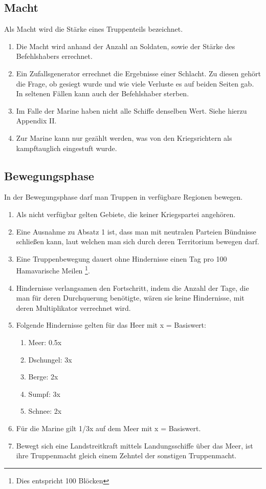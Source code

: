 \documentclass{article}
\begin{document}
\subsection{Macht}\label{macht}
Als Macht wird die Stärke eines Truppenteils bezeichnet.
\begin{enumerate}[(1)]
	\item Die Macht wird anhand der Anzahl an Soldaten, sowie der Stärke des Befehlshabers errechnet.
	\item Ein Zufallsgenerator errechnet die Ergebnisse einer Schlacht. Zu diesen gehört die Frage, ob gesiegt wurde und wie viele Verluste es auf beiden Seiten gab. In seltenen Fällen kann auch der Befehlshaber sterben.
	\item Im Falle der Marine haben nicht alle Schiffe denselben Wert. Siehe hierzu Appendix II.
	\item Zur Marine kann nur gezählt werden, was von den Kriegsrichtern als kampftauglich eingestuft wurde.
\end{enumerate}

\subsection{Bewegungsphase}
In der Bewegungsphase darf man Truppen in verfügbare Regionen bewegen.
\begin{enumerate}[(1)]
	\item Als nicht verfügbar gelten Gebiete, die keiner Kriegspartei angehören.
	\item Eine Ausnahme zu Absatz 1 ist, dass man mit neutralen Parteien Bündnisse schließen kann, laut welchen man sich durch deren Territorium bewegen darf.
	\item Eine Truppenbewegung dauert ohne Hindernisse einen Tag pro 100 Hamavarische Meilen \footnote{Dies entspricht 100 Blöcken}.
	\item Hindernisse verlangsamen den Fortschritt, indem die Anzahl der Tage, die man für deren Durchquerung benötigte, wären sie keine Hindernisse, mit deren Multiplikator verrechnet wird.
	\item Folgende Hindernisse gelten für das Heer mit x = Basiswert:
	\begin{enumerate}[1.]
		\item Meer: 0.5x
		\item Dschungel: 3x
		\item Berge: 2x
		\item Sumpf: 3x
		\item Schnee: 2x
	\end{enumerate}
	\item Für die Marine gilt 1/3x auf dem Meer mit x = Basiswert.
	\item Bewegt sich eine Landstreitkraft mittels Landungsschiffe über das Meer, ist ihre Truppenmacht gleich einem Zehntel der sonstigen Truppenmacht.
\end{enumerate}
\end{document}
